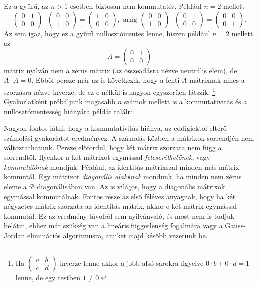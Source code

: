 \documentclass[9pt, a4paper, showtrims]{memoir}
\theoremstyle{plain}
\theoremstyle{remark}
\theoremstyle{definition}
\begin{document}
Ez a gyűrű, az $n>1$ esetben biztosan nem kommutatív. 
Például $n=2$ mellett
\[
    \begin{pmatrix}
        0&1\\
        0&0
    \end{pmatrix}
    \cdot
    \begin{pmatrix}
        0&0\\
        1&0
    \end{pmatrix}
    =
    \begin{pmatrix}
        1&0\\
        0&0
    \end{pmatrix},
    \text{ amíg }
    \begin{pmatrix}
        0&0\\
        1&0
    \end{pmatrix}
    \cdot
    \begin{pmatrix}
        0&1\\
        0&0
    \end{pmatrix}
    =
    \begin{pmatrix}
        0&0\\
        0&1
    \end{pmatrix}.
\]
Az sem igaz, hogy ez a gyűrű nullosztómentes lenne, hiszen például $n=2$ mellett az
\[
    A
    =
    \begin{pmatrix}
        0&1\\
        0&0
    \end{pmatrix}
\]
mátrix nyilván nem a zérus mátrix (az összeadásra nézve neutrális elem), 
de $A\cdot A=0$. 
Ebből persze már az is következik, hogy a fenti $A$ mátrixnak nincs a szorzásra nézve inverze,
de ez e nélkül is nagyon egyszerűen látszik.%
\footnote{
    Ha 
    \(
    \begin{pmatrix}
        a&b\\
        c&d
    \end{pmatrix}
    \)
    inverze lenne akkor a jobb alsó sarokra figyelve $0\cdot b +0\cdot d=1$ lenne, de egy testben $1\neq 0$.
}
Gyakorlatként próbáljunk magasabb $n$ számok mellett is a kommutativitás és a nullosztómentesség hiányára 
példát találni.

Nagyon fontos látni, hogy a kommutativitás hiánya, az eddigiektől eltérő számolási gyakorlatot eredményez.
A számolás közben a mátrixok sorrendjén nem változtathatunk. 
Persze előfordul, hogy két mátrix szorzata nem függ a sorrendtől. 
Ilyenkor a két mátrixot egymással \emph{felcserélhetőnek}, vagy \emph{kommutálónak} mondjuk.
Például, az identitás mátrixszal minden más mátrix kommutál.
Egy mátrixot \emph{diagonális alakúnak} mondunk, 
ha minden nem zérus eleme a fő diagonálisában van.
Az is világos, hogy a diagonális mátrixok egymással kommutálnak.
Fontos része az első féléves anyagnak, hogy ha két négyzetes mátrix szorzata az identitás mátrix,
akkor e két mátrix egymással kommutál.
Ez az eredmény távolról sem nyilvánvaló, és most nem is tudjuk belátni, ehhez már szükség van a lineáris függetlenség fogalmára vagy a Gauss-Jordan eliminációs algoritmusra, 
amiket majd később vezetünk be.\label{pg:kommutal}
\end{document}
